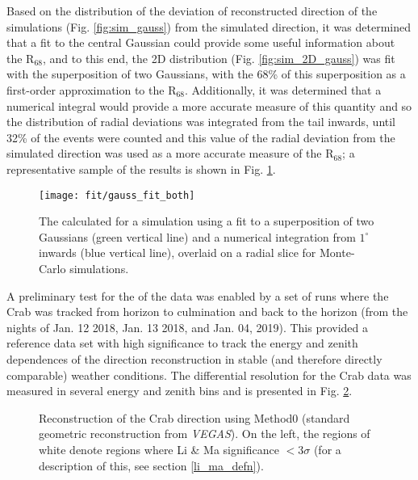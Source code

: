 \documentclass[main.tex]{subfiles}
\begin{document}
Based on the distribution of the deviation of reconstructed direction of the simulations (Fig. \ref{fig:sim_gauss}) from the simulated direction, it was determined that a fit to the central Gaussian could provide some useful information about the R$_{68}$, and to this end, the 2D distribution (Fig. \ref{fig:sim_2D_gauss}) was fit with the superposition of two Gaussians, with the 68\% of this superposition as a first-order approximation to the R$_{68}$. Additionally, it was determined that a numerical integral would provide a more accurate measure of this quantity and so the distribution of radial deviations was integrated from the tail inwards, until 32\% of the events were counted and this value of the radial deviation from the simulated direction was used as a more accurate measure of the R$_{68}$; a representative sample of the results is shown in Fig. \ref{fig:gauss_fit_both}.
\begin{figure}[htbp]
  \centering
  \texttt{[image: fit/gauss\_fit\_both]}
  \caption[\rse from the Gaussian fit and the numerical integral.]{The \rse calculated for a simulation using a fit to a superposition of two Gaussians (green vertical line) and a numerical integration from $1^\circ$ inwards (blue vertical line), overlaid on a radial slice for Monte-Carlo simulations.}
  \label{fig:gauss_fit_both}
\end{figure}

A preliminary test for the \rse of the data was enabled by a set of runs where the Crab was tracked from horizon to culmination and back to the horizon (from the nights of Jan. 12 2018, Jan. 13 2018, and Jan. 04, 2019). This provided a reference data set with high significance to track the energy and zenith dependences of the direction reconstruction in stable (and therefore directly comparable) weather conditions. The differential resolution for the Crab data was measured in several energy and zenith bins and is presented in Fig. \ref{fig:crab_initial}.

\begin{figure}[H]
  \begin{center}
  \end{center}
  \caption[Crab direction reconstruction using Method0.]{Reconstruction of the Crab direction using Method0 (standard geometric reconstruction from \textit{VEGAS}). On the left, the regions of white denote regions where Li \& Ma significance $<3\sigma$ (for a description of this, see section \ref{li_ma_defn}).}
  \label{fig:crab_initial}
\end{figure}
\end{document}
